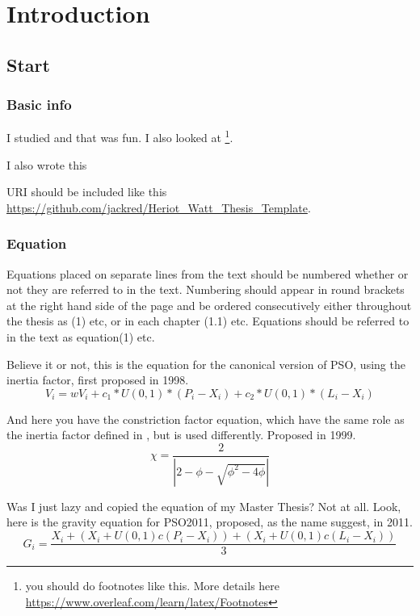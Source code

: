 \documentclass[../Thesis]{subfiles}
\begin{document}
\chapter{Introduction}
\section{Start}
\subsection{Basic info}
I studied \autocite{C01} and that was fun. I also looked at \autocite{C02} \footnote{you should do footnotes like this. More details here \url{https://www.overleaf.com/learn/latex/Footnotes}}.

I also wrote this \autocite{C05}

URI should be included like this \url{https://github.com/jackred/Heriot_Watt_Thesis_Template}.

\subsection{Equation}
Equations placed on separate lines from the text should be numbered whether or not they are referred to in the text. Numbering should appear in round brackets at the right hand side of the page and be ordered consecutively either throughout the thesis as (1) etc, or in each chapter (1.1) etc. Equations should be referred to in the text as equation(1) etc.\par
\bigskip
Believe it or not, this is the equation for the canonical version of PSO, using the inertia factor, first proposed in 1998.
\begin{equation} 
    V_{i} = wV_{i} + c_{1} * U(0,1) * (P_{i} - X_{i}) + c_{2} * U(0,1) * (L_{i} - X_{i}) 
    \label{eqn:velocityInertia} 
\end{equation} 

And here you have the constriction factor equation, which have the same role as the inertia factor defined in , but is used differently. Proposed in 1999. 
\begin{equation} 
    \chi = \dfrac{2}{|2 - \phi - \sqrt{\phi^{2} - 4\phi}|} 
    \label{eqn:velocityConstriction} 
\end{equation} 

Was I just lazy and copied the equation of my Master Thesis? Not at all. Look, here is the gravity equation for PSO2011, proposed, as the name suggest, in 2011.
\begin{equation} 
    G_{i} = \dfrac{X_{i} + (X_{i}+U(0,1)c(P_{i}-X_{i})) + (X_{i}+U(0,1)c(L_{i}-X_{i}))}{3}
    \label{eqn:gravityVelocity2011} 
\end{equation} 
\end{document}
